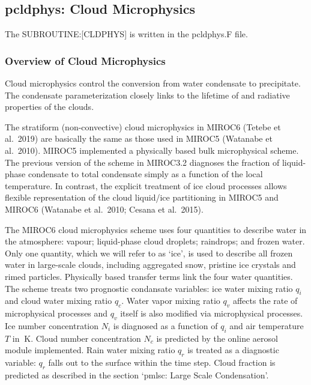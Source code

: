 \hypertarget{pcldphys-cloud-microphysics}{%
\subsection{pcldphys: Cloud
Microphysics}\label{pcldphys-cloud-microphysics}}

The SUBROUTINE:{[}CLDPHYS{]} is written in the pcldphys.F file.

\hypertarget{overview-of-cloud-microphysics}{%
\subsubsection{Overview of Cloud
Microphysics}\label{overview-of-cloud-microphysics}}

Cloud microphysics control the conversion from water condensate to
precipitate. The condensate parameterization closely links to the
lifetime of and radiative properties of the clouds.

The stratiform (non-convective) cloud microphysics in MIROC6 (Tetebe et
al.~2019) are basically the same as those used in MIROC5 (Watanabe et
al.~2010). MIROC5 implemented a physically based bulk microphysical
scheme. The previous version of the scheme in MIROC3.2 diagnoses the
fraction of liquid-phase condensate to total condensate simply as a
function of the local temperature. In contrast, the explicit treatment
of ice cloud processes allows flexible representation of the cloud
liquid/ice partitioning in MIROC5 and MIROC6 (Watanabe et al.~2010;
Cesana et al.~2015).

The MIROC6 cloud microphysics scheme uses four quantities to describe
water in the atmosphere: vapour; liquid-phase cloud droplets; raindrops;
and frozen water. Only one quantity, which we will refer to as `ice', is
used to describe all frozen water in large-scale clouds, including
aggregated snow, pristine ice crystals and rimed particles. Physically
based transfer terms link the four water quantities. The scheme treats
two prognostic condansate variables: ice water mixing ratio \(q_i\) and
cloud water mixing ratio \(q_c\). Water vapor mixing ratio \(q_v\)
affects the rate of microphysical processes and \(q_v\) itself is also
modified via microphysical processes. Ice number concentration \(N_i\)
is diagnosed as a function of \(q_i\) and air temperature \(T\) in
\(\mathrm{~K}\). Cloud number concentration \(N_c\) is predicted by the
online aerosol module implemented. Rain water mixing ratio \(q_r\) is
treated as a diagnostic variable: \(q_r\) falls out to the surface
within the time step. Cloud fraction is predicted as described in the
section `pmlsc: Large Scale Condensation'.

